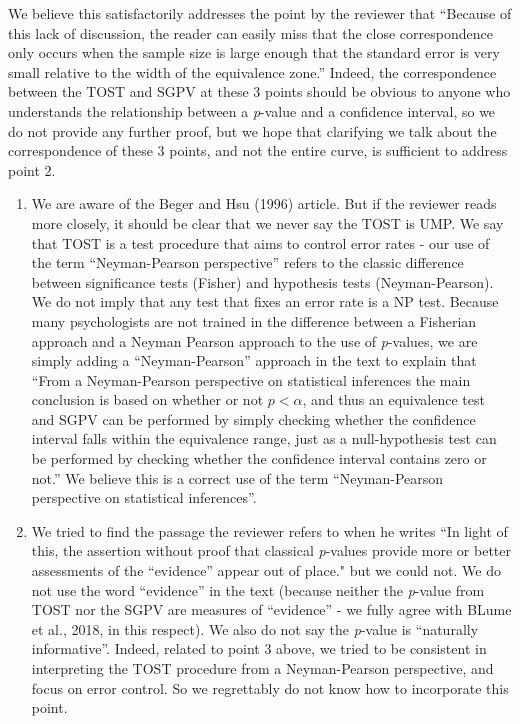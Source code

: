 \documentclass[man]{apa6}
\begin{document}
We believe this satisfactorily addresses the point by the reviewer that \enquote{Because of this
lack of discussion, the reader can easily miss that the close correspondence only occurs when
the sample size is large enough that the standard error is very small relative to the width of the
equivalence zone.} Indeed, the correspondence between the TOST and SGPV at these 3 points should be obvious to anyone who understands the relationship between a \emph{p}-value and a confidence interval, so we do not provide any further proof, but we hope that clarifying we talk about the correspondence of these 3 points, and not the entire curve, is sufficient to address point 2.

\begin{enumerate}
\def\labelenumi{\arabic{enumi}.}
\setcounter{enumi}{2}
\item
  We are aware of the Beger and Hsu (1996) article. But if the reviewer reads more closely, it should be clear that we never say the TOST is UMP. We say that TOST is a test procedure that aims to control error rates - our use of the term \enquote{Neyman-Pearson perspective} refers to the classic difference between significance tests (Fisher) and hypothesis tests (Neyman-Pearson). We do not imply that any test that fixes an error rate is a NP test. Because many psychologists are not trained in the difference between a Fisherian approach and a Neyman Pearson approach to the use of \emph{p}-values, we are simply adding a \enquote{Neyman-Pearson} approach in the text to explain that \enquote{From a Neyman-Pearson perspective on statistical inferences the main conclusion is based on whether or not \(p < \alpha\), and thus an equivalence test and SGPV can be performed by simply checking whether the confidence interval falls within the equivalence range, just as a null-hypothesis test can be performed by checking whether the confidence interval contains zero or not.} We believe this is a correct use of the term \enquote{Neyman-Pearson perspective on statistical inferences}.
\item
  We tried to find the passage the reviewer refers to when he writes \enquote{In light of this, the assertion without proof that classical \emph{p}-values provide more or better assessments of the ``evidence} appear out of place." but we could not. We do not use the word \enquote{evidence} in the text (because neither the \emph{p}-value from TOST nor the SGPV are measures of \enquote{evidence} - we fully agree with BLume et al., 2018, in this respect). We also do not say the \emph{p}-value is \enquote{naturally informative}. Indeed, related to point 3 above, we tried to be consistent in interpreting the TOST procedure from a Neyman-Pearson perspective, and focus on error control. So we regrettably do not know how to incorporate this point.

\end{enumerate}
\end{document}

